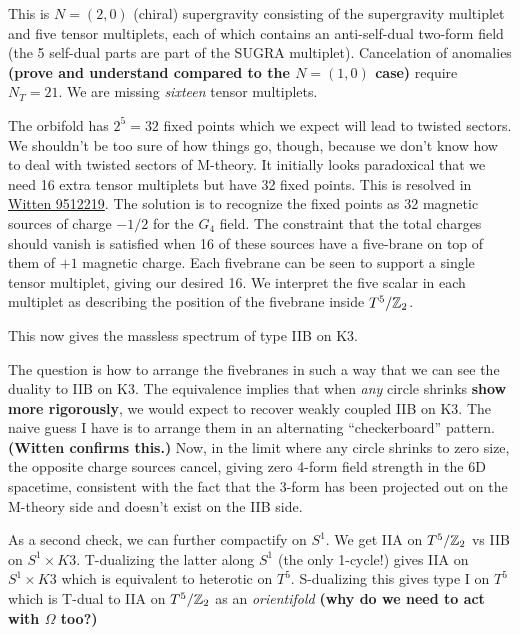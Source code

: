 \documentclass[11pt, class=article, crop=false]{standalone}
\begin{document}
\begin{enumerate}
	This is $N=(2,0)$ (chiral) supergravity consisting of the supergravity multiplet and five tensor multiplets, each of which contains an anti-self-dual two-form field (the 5 self-dual parts are part of the SUGRA multiplet). Cancelation of anomalies \textbf{(prove and understand compared to the $N = (1,0)$ case)} require $N_T = 21$. We are missing \emph{sixteen} tensor multiplets.  
	
	
	The orbifold has $2^5 = 32$ fixed points which we expect will lead to twisted sectors. We shouldn't be too sure of how things go, though, because we don't know how to deal with twisted sectors of M-theory. It initially looks paradoxical that we need 16 extra tensor multiplets but have 32 fixed points. This is resolved in \href{https://arxiv.org/pdf/hep-th/9512219.pdf}{Witten 9512219}. The solution is to recognize the fixed points as 32 magnetic sources of charge $-1/2$ for the $G_4$ field. The constraint that the total charges should vanish is satisfied when 16 of these sources have a five-brane on top of them of $+1$ magnetic charge. Each fivebrane can be seen to support a single tensor multiplet, giving our desired 16. We interpret the five scalar in each multiplet as describing the position of the fivebrane inside $T^5/\mathbb{Z}_2$. 
	
	This now gives the massless spectrum of type IIB on K3. 
	
	The question is how to arrange the fivebranes in such a way that we can see the duality to IIB on K3. The equivalence implies that when \emph{any} circle shrinks \textbf{show more rigorously}, we would expect to recover weakly coupled IIB on K3. The naive guess I have is to arrange them in an alternating ``checkerboard'' pattern. \textbf{(Witten confirms this.)} Now, in the limit where any circle shrinks to zero size, the opposite charge sources cancel, giving zero 4-form field strength in the 6D spacetime, consistent with the fact that the 3-form has been projected out on the M-theory side and doesn't exist on the IIB side. 
	
	As a second check, we can further compactify on $S^1$. We get IIA on $T^5/\mathbb{Z}_2$ vs IIB on $S^1 \times K3$. T-dualizing the latter along $S^1$ (the only 1-cycle!) gives IIA on $S^1 \times K3$ which is equivalent to heterotic on $T^5$. S-dualizing this gives type I on $T^5$ which is T-dual to IIA on $T^5/\mathbb{Z}_2$  as an \emph{orientifold} \textbf{(why do we need to act with $\Omega$ too?)}
	
	

\end{enumerate}
\end{document}
